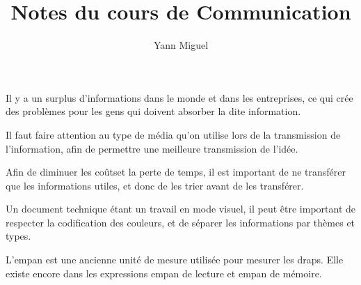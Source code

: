 \documentclass[a4paper, 12pt]{article}
\title{Notes du cours de Communication}
\author{Yann Miguel}
\begin{document}
\ttfamily
\maketitle
\newpage
Il y a un surplus d'informations dans le monde et dans les entreprises, ce qui cr\'ee des probl\`emes pour les gens qui
doivent absorber la dite information.

Il faut faire attention au type de m\'edia qu'on utilise lors de la transmission de l'information, afin de permettre une
meilleure transmission de l'id\'ee.

Afin de diminuer les co\^utset la perte de temps, il est important de ne transf\'erer que les informations utiles, et
donc de les trier avant de les transf\'erer.

Un document technique \'etant un travail en mode visuel, il peut \^etre important de respecter la codification des
couleurs, et de s\'eparer les informations par th\`emes et types.

L'empan est une ancienne unit\'e de mesure utilis\'ee pour mesurer les draps. Elle existe encore dans les expressions
empan de lecture et empan de m\'emoire.
\end{document}
